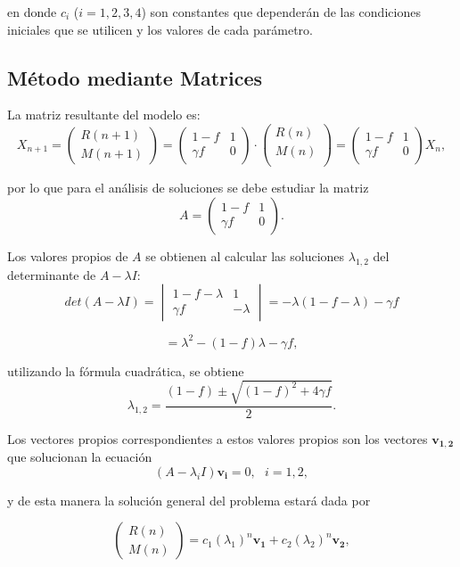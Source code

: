 en donde $c_{i}$ ($i=1,2,3,4$) son constantes que dependerán de las condiciones iniciales que se utilicen y los valores de cada parámetro.

\subsection{Método mediante Matrices}

La matriz resultante del modelo es:
$$X_{n+1}=\begin{pmatrix}
    R(n+1) \\
    M(n+1) 
    \end{pmatrix}=
    \begin{pmatrix}
    1-f & 1\\
    \gamma f & 0 
    \end{pmatrix} \cdot 
    \begin{pmatrix}
    R(n) \\
    M(n) \\
    \end{pmatrix}=
    \begin{pmatrix}
        1-f & 1\\
        \gamma f & 0 
        \end{pmatrix} X_n,$$

por lo que para el análisis de soluciones se debe estudiar la matriz
$$A=\begin{pmatrix}
    1-f & 1\\
    \gamma f & 0 
    \end{pmatrix}.$$

Los valores propios de $A$ se obtienen al calcular las soluciones $\lambda_{1,2}$ del determinante de $A-\lambda I$:
$$det(A-\lambda I) = \begin{vmatrix}
    1-f-\lambda & 1\\
    \gamma f & -\lambda 
    \end{vmatrix} = -\lambda(1-f-\lambda)-\gamma f$$

$$=\lambda^2-(1-f)\lambda-\gamma f,$$

utilizando la fórmula cuadrática, se obtiene
$$\lambda_{1,2}=\dfrac{(1-f)\pm\sqrt{(1-f)^2+4\gamma f}}{2}.$$

Los vectores propios correspondientes a estos valores propios son los vectores $\mathbf{v_{1,2}}$ que solucionan la ecuación
$$(A-\lambda_i I)\mathbf{v_i}=0, \:\:\: i=1,2,$$

y de esta manera la solución general del problema estará dada por

$$\begin{pmatrix}
    R(n) \\
    M(n) 
    \end{pmatrix}= c_1(\lambda_1)^n \mathbf{v_1}+c_2(\lambda_2)^n \mathbf{v_2},$$

